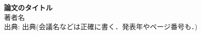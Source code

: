 \documentclass[a4paper, 10pt]{ltjsarticle}
\newcommand{\Title}[3]{
\begin{center}
    {\bf \large{#1}}\\
    #2\\
    出典: #3
\end{center}
}
\begin{document}
\Title{論文のタイトル}{著者名}{出典(会議名などは正確に書く．発表年やページ番号も．)}

%

% 
\end{document}
